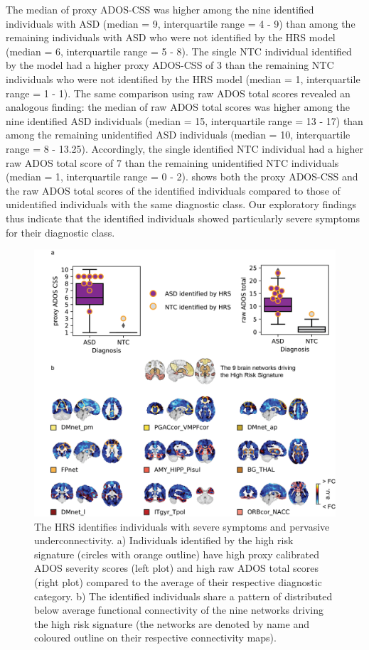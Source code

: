 \documentclass[9pt,lineno]{elife}
\begin{document}
The median of proxy ADOS-CSS was higher among the nine identified individuals with ASD (median = 9, interquartile range = 4 - 9) than among the remaining individuals with ASD who were not identified by the HRS model (median = 6, interquartile range = 5 - 8). The single NTC individual identified by the model had a higher proxy ADOS-CSS of 3 than the remaining NTC individuals who were not identified by the HRS model (median = 1, interquartile range = 1 - 1). The same comparison using raw ADOS total scores revealed an analogous finding: the median of raw ADOS total scores was higher among the nine identified ASD individuals (median = 15, interquartile range = 13 - 17) than among the remaining unidentified ASD individuals (median = 10, interquartile range = 8 - 13.25). Accordingly, the single identified NTC individual had a higher raw ADOS total score of 7 than the remaining unidentified NTC individuals (median = 1, interquartile range = 0 - 2).   shows both the proxy ADOS-CSS and the raw ADOS total scores of the identified individuals compared to those of unidentified individuals with the same diagnostic class. Our exploratory findings thus indicate that the identified individuals showed particularly severe symptoms for their diagnostic class.

\begin{figure}
\includegraphics[width=\linewidth]{fig3_profile}
    \caption{The HRS identifies individuals with severe symptoms and pervasive underconnectivity.
a) Individuals identified by the high risk signature (circles with orange outline) have high proxy calibrated ADOS severity scores (left plot) and high raw ADOS total scores (right plot) compared to the average of their respective diagnostic category. b) The identified individuals share a pattern of distributed below average functional connectivity of the nine networks driving the high risk signature (the networks are denoted by name and coloured outline on their respective connectivity maps).}
\label{fig:3_profile}
\end{figure}
\end{document}
